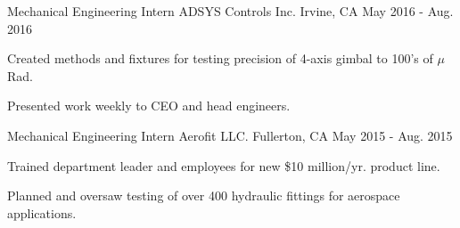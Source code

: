 \begin{cventries}
  \cventry
    {Mechanical Engineering Intern} %
    {ADSYS Controls Inc.} %
    {Irvine, CA} %
    {May 2016 - Aug. 2016} %
    {
      \begin{cvitems} %
        \item {Created methods and fixtures for testing precision of 4-axis gimbal
          to 100's of $\mu$Rad.}
        \item {Presented work weekly to CEO and head engineers.}
      \end{cvitems}
    }

  \cventry
    {Mechanical Engineering Intern} %
    {Aerofit LLC.} %
    {Fullerton, CA} %
    {May 2015 - Aug. 2015} %
    {
      \begin{cvitems} %
        \item {Trained department leader and employees for new \$10 million/yr.
          product line.}
        \item {Planned and oversaw testing of over 400 hydraulic fittings for
          aerospace applications.}
      \end{cvitems}
    }

\end{cventries}
